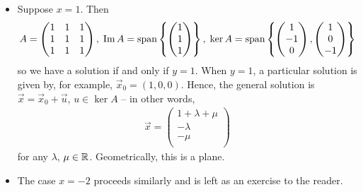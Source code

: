 \documentclass{../../template/note}
\begin{document}
\begin{example}
\begin{itemize}
\begin{align*}
\begin{pmatrix}
                \end{pmatrix} \\
                &= \frac{1}{(1-x)(x+2)} \begin{pmatrix}
                 y-x \\
                 -x+y \\
                 2-xy-y \\
                \end{pmatrix}
            \end{align*}
            so we have a unique solution.
            \item Suppose \(x = 1\). Then
            \begin{align*}
                A = \begin{pmatrix}
                 1 & 1 & 1 \\
                 1 & 1 & 1 \\
                 1 & 1 & 1 \\
                \end{pmatrix},\; \operatorname{Im} A = \operatorname{span}\left\{\begin{pmatrix}
                 1 \\
                 1 \\
                 1 \\
                \end{pmatrix}\right\},\; \ker A = \operatorname{span}\left\{\begin{pmatrix}
                 1 \\
                 -1 \\
                 0 \\
                \end{pmatrix}, \begin{pmatrix}
                 1 \\
                 0 \\
                 -1 \\
                \end{pmatrix}\right\}
            \end{align*}
            so we have a solution if and only if \(y=1\). When \(y=1\), a particular solution is given by, for example, \(\vec x_0 = (1, 0, 0)\). Hence, the general solution is \(\vec x = \vec x_0 + \vec u\), \(u \in \ker A\) -- in other words,
            \begin{align*}
                \vec x = \begin{pmatrix}
                 1+\lambda + \mu \\
                 -\lambda \\
                 -\mu \\
                \end{pmatrix}
            \end{align*}
            for any \(\lambda\), \(\mu \in \mathbb R\). Geometrically, this is a plane.
            \item The case \(x=-2\) proceeds similarly and is left as an exercise to the reader.
        \end{itemize}
    \end{example}
    
\end{document}
